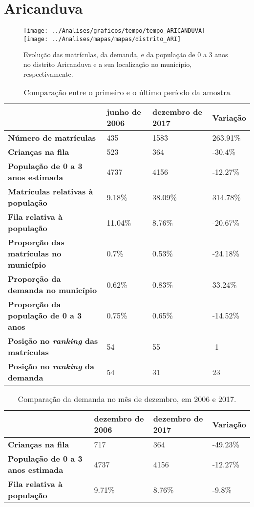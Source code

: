 \section{Aricanduva}
\begin{figure}[H]
	\centering
	\texttt{[image: ../Analises/graficos/tempo/tempo\_ARICANDUVA]}
	\texttt{[image: ../Analises/mapas/mapas/distrito\_ARI]}
	\caption{Evolução das matrículas, da demanda, e da população de 0 a 3 anos no distrito Aricanduva e a sua localização no município, respectivamente.}
\end{figure}
\begin{table}[H]
	\begin{tabular}{|l|l|l|l|}
		\hline
		\textbf{}                                      & \textbf{junho de 2006}       & \textbf{dezembro de 2017}    & \textbf{Variação} \\ \hline
		\textbf{Número de matrículas}                  & 435 & 1583 & 263.91\% \\ \hline
		\textbf{Crianças na fila}                      & 523 & 364 & -30.4\% \\ \hline
		\textbf{População de 0 a 3 anos estimada}      & 4737 & 4156 & -12.27\% \\ \hline
		\textbf{Matrículas relativas à população}      & 9.18\% & 38.09\% & 314.78\% \\ \hline
		\textbf{Fila relativa à população}             & 11.04\% & 8.76\% & -20.67\% \\ \hline
		\textbf{Proporção das matrículas no município} & 0.7\% & 0.53\% & -24.18\% \\ \hline
		\textbf{Proporção da demanda no município}     & 0.62\% & 0.83\% & 33.24\% \\ \hline
		\textbf{Proporção da população de 0 a 3 anos}  & 0.75\% & 0.65\% & -14.52\% \\ \hline
		\textbf{Posição no \textit{ranking} das matrículas}     & 54 & 55 & -1 \\ \hline
		\textbf{Posição no \textit{ranking} da demanda}         & 54 & 31 & 23 \\ \hline
	\end{tabular}
	\caption{Comparação entre o primeiro e o último período da amostra}
\end{table}
\begin{table}[H]
	\begin{tabular}{|l|l|l|l|}
		\hline
		\textbf{}                                 & \textbf{dezembro de 2006} & \textbf{dezembro de 2017} & \textbf{Variação} \\ \hline
		\textbf{Crianças na fila}                      & 717 & 364 & -49.23\% \\ \hline
		\textbf{População de 0 a 3 anos estimada}      & 4737 & 4156 & -12.27\% \\ \hline
		\textbf{Fila relativa à população}             & 9.71\% & 8.76\% & -9.8\% \\ \hline
	\end{tabular}
	\caption{Comparação da demanda no mês de dezembro, em 2006 e 2017.}
\end{table}
